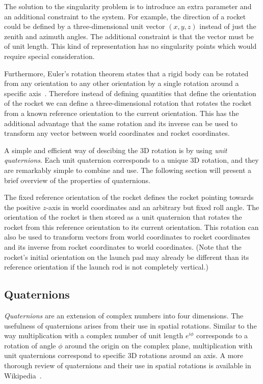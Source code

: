 The solution to the singularity problem is to introduce an extra
parameter and an additional constraint to the system.  For example,
the direction of a rocket could be defined by a three-dimensional unit
vector $(x,y,z)$ instead of just the zenith and azimuth angles.  The
additional constraint is that the vector must be of unit length.  This
kind of representation has no singularity points which would require
special consideration.

Furthermore, Euler's rotation theorem states that a rigid body can be
rotated from any orientation to any other orientation by a single
rotation around a specific axis~\cite{wiki-euler-rotation-theorem}.
Therefore instead of defining quantities that define the orientation
of the rocket we can define a three-dimensional rotation that rotates
the rocket from a known reference orientation to the current
orientation. This has the additional advantage that the same rotation
and its inverse can be used to transform any vector between world
coordinates and rocket coordinates.

A simple and efficient way of descibing the 3D rotation is by using
{\it unit quaternions}.  Each unit quaternion corresponds to a unique
3D rotation, and they are remarkably simple to combine and use.  The
following section will present a brief overview of the properties of
quaternions.

The fixed reference orientation of the rocket defines the rocket
pointing towards the positive $z$-axis in world coordinates and an
arbitrary but fixed roll angle.  The orientation of the rocket is then
stored as a unit quaternion that rotates the rocket from this
reference orientation to its current orientation.  
This rotation can also be used to transform vectors from world
coordinates to rocket coordinates and its inverse from rocket
coordinates to world coordinates.  (Note that the rocket's initial
orientation on the launch pad may already be different than its
reference orientation if the launch rod is not completely vertical.)




\subsection{Quaternions}

{\it Quaternions} are an extension of complex numbers into four
dimensions.  The usefulness of quaternions arises from their use in
spatial rotations.  Similar to the way multiplication with a complex
number of unit length $e^{i\phi}$ corresponds to a rotation of angle
$\phi$ around the origin on the complex plane, multiplication with
unit quaternions correspond to specific 3D rotations around an axis.
A more thorough review of quaternions and their use in spatial
rotations is available in Wikipedia~\cite{wiki-quaternion-rotations}.

